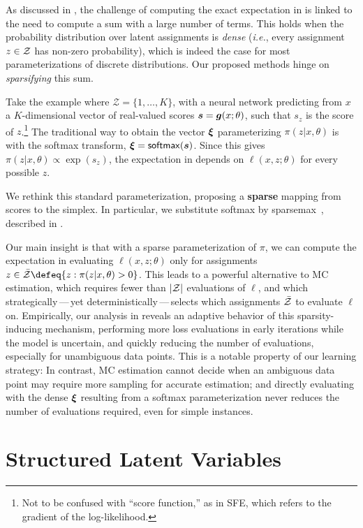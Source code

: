 As discussed in , the challenge of computing the
exact expectation in  is linked to the need to compute
a sum with a large number of terms. This holds when the probability
distribution over latent assignments is {\it dense} ({\it i.e.},
every assignment $z \in \mathcal{Z}$ has non-zero probability), which is
indeed the case for most parameterizations of discrete distributions.
Our proposed methods hinge on {\it sparsifying} this sum.

Take the example where $\mathcal Z = \{1, \ldots, K\}$, with a neural
network predicting from $x$ a $K$-dimensional vector of real-valued
scores $\bm{s} = \bm{g}(x; \theta)$, such that $s_z$ is the score of
$z$.\footnote{Not to be confused with ``score function,'' as in SFE,
    which refers to the gradient of the log-likelihood.} The traditional
way to obtain the vector $\bm{\xi}$ parameterizing $\pi(z|x,\theta)$ is
with the softmax transform, \ie $\bm{\xi} = \operatorname*{\mathsf{softmax}}(\bm{s})$. Since this
gives $\pi(z|x,\theta) \propto \exp(s_z)$, the expectation in
 depends on $\ell(x, z; \theta)$ for every possible
$z$.

We rethink this standard parameterization, proposing a
\textbf{sparse} mapping from scores to the simplex. In particular, we
substitute softmax by sparsemax~\citep{sparsemax}, described in
.

Our main insight is that with a sparse parameterization of $\pi$, we
can compute the expectation in  evaluating $\ell(x, z;
    \theta)$ only for assignments $z \in \bar\ZZ \defeq \{z : \pi(z | x,
    \theta) > 0\}$. This leads to a powerful alternative to MC
estimation, which requires fewer than $|\mathcal{Z}|$ evaluations of $\ell$,
and which strategically\,---\,yet deterministically\,---\,selects
which assignments $\bar{\mathcal{Z}}$ to evaluate $\ell$ on. Empirically, our
analysis in  reveals an adaptive behavior of
this sparsity-inducing mechanism, performing more loss evaluations in
early iterations while the model is uncertain, and quickly reducing
the number of evaluations, especially for unambiguous data points.
This is a notable property of our learning strategy: In contrast, MC
estimation cannot decide when an ambiguous data point may require
more sampling for accurate estimation; and directly evaluating
 with the dense $\bm{\xi}$ resulting from a softmax
parameterization never reduces the number of evaluations required,
even for simple instances.

\section{\label{sec:structured}Structured Latent Variables}


